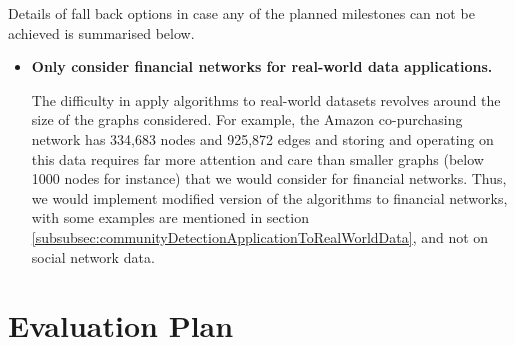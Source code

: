 \documentclass[12pt]{article}
\numberwithin{equation}{section}
\begin{document}
Details of fall back options in case any of the planned milestones can not be achieved is summarised below.
\begin{itemize}
	\item \textbf{Only consider financial networks for real-world data applications.}

	The difficulty in apply algorithms to real-world datasets revolves around the size of the graphs considered. For example, the Amazon co-purchasing network has 334,683 nodes and 925,872 edges and storing and operating on this data requires far more attention and care than smaller graphs (below 1000 nodes for instance) that we would consider for financial networks. Thus, we would implement modified version of the algorithms to financial networks, with some examples are mentioned in section \ref{subsubsec:communityDetectionApplicationToRealWorldData}, and not on social network data.
\end{itemize}


\newpage
\thispagestyle{plain}
\mbox{}
\section {Evaluation Plan}
\label{sec:evaluationPlan}


\newpage
\thispagestyle{plain}
\mbox{}



\end{document}
